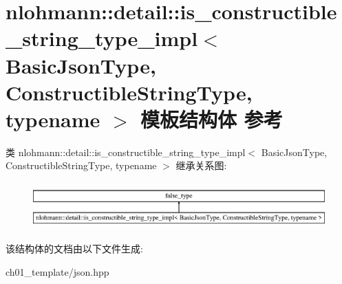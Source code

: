 \hypertarget{structnlohmann_1_1detail_1_1is__constructible__string__type__impl}{}\section{nlohmann\+::detail\+::is\+\_\+constructible\+\_\+string\+\_\+type\+\_\+impl$<$ Basic\+Json\+Type, Constructible\+String\+Type, typename $>$ 模板结构体 参考}
\label{structnlohmann_1_1detail_1_1is__constructible__string__type__impl}
类 nlohmann\+::detail\+::is\+\_\+constructible\+\_\+string\+\_\+type\+\_\+impl$<$ Basic\+Json\+Type, Constructible\+String\+Type, typename $>$ 继承关系图\+:\begin{figure}[H]
\begin{center}
\leavevmode
\includegraphics[height=1.809370cm]{structnlohmann_1_1detail_1_1is__constructible__string__type__impl}
\end{center}
\end{figure}


该结构体的文档由以下文件生成\+:\begin{DoxyCompactItemize}
\item 
ch01\+\_\+template/json.\+hpp\end{DoxyCompactItemize}

